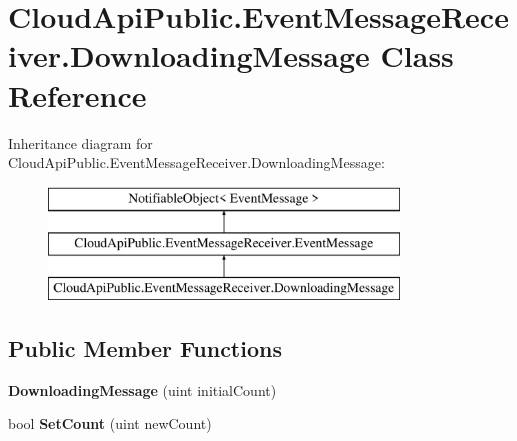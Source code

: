\hypertarget{class_cloud_api_public_1_1_event_message_receiver_1_1_downloading_message}{\section{Cloud\-Api\-Public.\-Event\-Message\-Receiver.\-Downloading\-Message Class Reference}
\label{class_cloud_api_public_1_1_event_message_receiver_1_1_downloading_message}
}
Inheritance diagram for Cloud\-Api\-Public.\-Event\-Message\-Receiver.\-Downloading\-Message\-:\begin{figure}[H]
\begin{center}
\leavevmode
\includegraphics[height=3.000000cm]{class_cloud_api_public_1_1_event_message_receiver_1_1_downloading_message}
\end{center}
\end{figure}
\subsection*{Public Member Functions}
\begin{DoxyCompactItemize}
\item 
\hypertarget{class_cloud_api_public_1_1_event_message_receiver_1_1_downloading_message_a930b8c1fe63b202ebd72b2b9017e231f}{{\bfseries Downloading\-Message} (uint initial\-Count)}\label{class_cloud_api_public_1_1_event_message_receiver_1_1_downloading_message_a930b8c1fe63b202ebd72b2b9017e231f}

\item 
\hypertarget{class_cloud_api_public_1_1_event_message_receiver_1_1_downloading_message_ab31cf882209ec3cca5ef96780d80ece8}{bool {\bfseries Set\-Count} (uint new\-Count)}\label{class_cloud_api_public_1_1_event_message_receiver_1_1_downloading_message_ab31cf882209ec3cca5ef96780d80ece8}

\end{DoxyCompactItemize}

